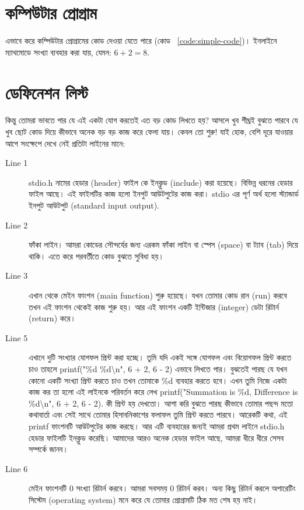 \section{কম্পিউটার প্রোগ্রাম}
এভাবে করে কম্পিউটার প্রোগ্রামের কোড দেওয়া যেতে পারে (কোড ~\ref{code:simple-code})।  ইনলাইনে ম্যাথমোডে সংখ্যা ব্যবহার করা যায়, যেমন: $6 + 2 = 8$.




\section{ডেফিনেশন লিস্ট}
কিন্তু তোমরা ভাবতে পার যে এই একটা যোগ করতেই এত বড় কোড লিখতে হয়? আসলে খুব শীঘ্রই বুঝতে পারবে যে খুব ছোট কোড দিয়ে কীভাবে অনেক বড় বড় কাজ করে ফেলা যায়। কেবল তো শুরু! যাই হোক, বেশি দূরে যাওয়ার আগে সংক্ষেপে দেখে নেই প্রতিটা লাইনের মানে:
\begin{description}
\item[Line 1] stdio.h নামের হেডার (header) ফাইল কে ইনক্লুড (include) করা হয়েছে। বিভিন্ন ধরনের হেডার ফাইল আছে। এই ফাইলটির কাজ হলো ইনপুট আউটপুটের কাজ করা। stdio এর পূর্ণ অর্থ হলো স্ট্যান্ডার্ড ইনপুট আউটপুট (standard input output).
\item[Line 2] ফাঁকা লাইন। আমরা কোডের সৌন্দর্যের জন্য এরকম ফাঁকা লাইন বা স্পেস (space) বা ট্যাব (tab) দিয়ে থাকি। এতে করে পরবর্তীতে কোড বুঝতে সুবিধা হয়।
\item[Line 3] এখান থেকে মেইন ফাংশন (main function) শুরু হয়েছে। যখন তোমার কোড রান (run) করবে তখন এই ফাংশন থেকেই কাজ শুরু হয়। আর এই ফাংশন একটি ইন্টিজার (integer) ডেটা রিটার্ন (return) করে।
\item[Line 5] এখানে দুটি সংখ্যার যোগফল প্রিন্ট করা হচ্ছে। তুমি যদি একই সঙ্গে যোগফল এবং বিয়োগফল প্রিন্ট করতে চাও তাহলে printf("\%d \%d\textbackslash n", 6 + 2, 6 - 2) এভাবে লিখতে পার। বুঝতেই পারছ যে যখন কোনো একটি সংখ্যা প্রিন্ট করতে চাও তখন তোমাকে \%d ব্যবহার করতে হবে। এখন তুমি নিজে একটা কাজ কর তা হলো এই লাইনকে পরিবর্তন করে লেখ printf("Summation is \%d, Difference is \%d\textbackslash n", 6 + 2, 6 - 2). কী প্রিন্ট হয় দেখতো। আশা করি বুঝতে পারছ কীভাবে তোমার পছন্দ মতো কথাবার্তা এবং সেই সাথে তোমার হিসাবনিকাশের ফলাফল তুমি প্রিন্ট করতে পারবে। আরেকটি কথা, এই printf ফাংশনটি আউটপুটের কাজ করছে। আর এটি ব্যবহারের জন্যই আমরা প্রথম লাইনে stdio.h হেডার ফাইলটি ইনক্লুড করেছি। আমাদের আরও অনেক হেডার ফাইল আছে, আমরা ধীরে ধীরে সেসব সম্পর্কে জানব।
\item[Line 6] মেইন ফাংশনটি $0$ সংখ্যা রিটার্ন করবে। আমরা সবসময় $0$ রিটার্ন করব। অন্য কিছু রিটার্ন করলে অপারেটিং সিস্টেম (operating system) মনে করে যে তোমার প্রোগ্রামটি ঠিক মত শেষ হয় নাই।
\end{description}


